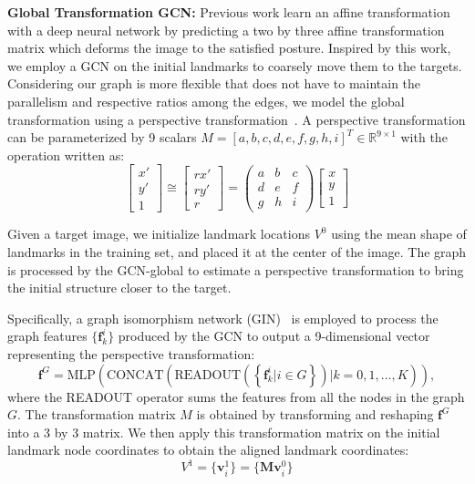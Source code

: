 \documentclass[runningheads]{llncs}
\begin{document}
\textbf{Global Transformation GCN:} 
Previous work \cite{jaderberg2015spatial,lv2017deep} learn an affine transformation with a deep neural network by predicting a two by three affine transformation matrix which deforms the image to the satisfied posture. Inspired by this work, we employ a GCN on the initial landmarks to coarsely move them to the targets. Considering our graph is more flexible that does not have to maintain the parallelism and respective ratios among the edges, we model the global transformation using a perspective transformation~\cite{detone2016deep}. A perspective transformation can be parameterized by 9 scalars $M=[a,b,c,d,e,f,g,h,i]^T \in\mathbb{R}^{9 \times 1}$ with the operation written as:
\begin{equation}
 \left[ \begin{array}{c}
x' \\
y' \\
1 \end{array} \right]
\cong \left[ \begin{array}{c}
rx' \\
ry' \\
r \end{array} \right] 
= \left( \begin{array}{ccc}
a & b & c \\
d & e & f \\
g & h & i \end{array} \right)
\left[ \begin{array}{c}
x \\
y \\
1 \end{array} \right]
\end{equation}


Given a target image, we initialize landmark locations $V^0$ using the mean shape of landmarks in the training set, and placed it at the center of the image. The graph is processed by the GCN-global to estimate a perspective transformation to bring the initial structure closer to the target. 

Specifically, a graph isomorphism network (GIN)~\cite{xu2018powerful} is employed to process the graph features $\{ \mathbf{f}^i_k \}$ produced by the GCN to output a 9-dimensional vector representing the perspective transformation:
\begin{equation}
	\mathbf{f}^G = \mbox{MLP}\left ( \mbox{CONCAT}\left ( \mbox{READOUT}\left(\left \{ \mathbf{f}^i_k | i \in G \right \} \right) | k=0,1,\dots,K \right) \right ),
\end{equation}
where the READOUT operator sums the features from all the nodes in the graph $G$. The transformation matrix $M$ is obtained by transforming and reshaping $\mathbf{f}^G$ into a 3 by 3 matrix. We then apply this transformation matrix on the initial landmark node coordinates to obtain the aligned landmark coordinates:
\begin{equation}
    V^1 = \{\mathbf{v}^1_i\} = \{ \mathbf{M}\mathbf{v}^0_i\}
\end{equation}
\end{document}
